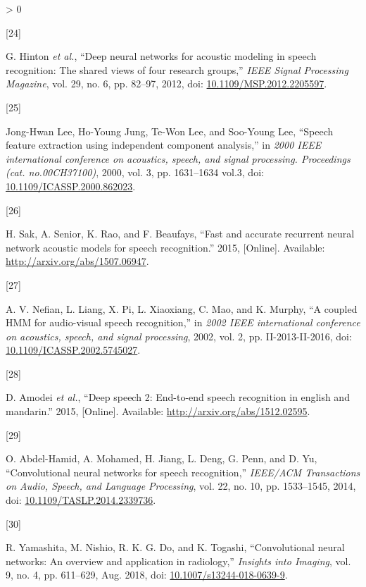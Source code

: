 \documentclass[
  a4paper,
]{article}
\newlength{\cslhangindent}
\newlength{\csllabelwidth}
\newenvironment{CSLReferences}[2] %
 {%
  \setlength{\parindent}{0pt}
  \ifodd #1 \everypar{\setlength{\hangindent}{\cslhangindent}}\ignorespaces\fi
  \ifnum #2 > 0
  \setlength{\parskip}{#2\baselineskip}
  \fi
 }%
 {}
\newcommand{\CSLLeftMargin}[1]{\parbox[t]{\csllabelwidth}{#1}}
\newcommand{\CSLRightInline}[1]{\parbox[t]{\linewidth - \csllabelwidth}{#1}\break}
\begin{document}
\begin{CSLReferences}{0}{0}
\leavevmode\hypertarget{ref-6296526}{}%
\CSLLeftMargin{{[}24{]} }
\CSLRightInline{G. Hinton \emph{et al.}, {``Deep neural networks for
acoustic modeling in speech recognition: The shared views of four
research groups,''} \emph{IEEE Signal Processing Magazine}, vol. 29, no.
6, pp. 82--97, 2012, doi:
\href{https://doi.org/10.1109/MSP.2012.2205597}{10.1109/MSP.2012.2205597}.}

\leavevmode\hypertarget{ref-862023}{}%
\CSLLeftMargin{{[}25{]} }
\CSLRightInline{Jong-Hwan Lee, Ho-Young Jung, Te-Won Lee, and Soo-Young
Lee, {``Speech feature extraction using independent component
analysis,''} in \emph{2000 IEEE international conference on acoustics,
speech, and signal processing. Proceedings (cat. no.00CH37100)}, 2000,
vol. 3, pp. 1631--1634 vol.3, doi:
\href{https://doi.org/10.1109/ICASSP.2000.862023}{10.1109/ICASSP.2000.862023}.}

\leavevmode\hypertarget{ref-sak2015fast}{}%
\CSLLeftMargin{{[}26{]} }
\CSLRightInline{H. Sak, A. Senior, K. Rao, and F. Beaufays, {``Fast and
accurate recurrent neural network acoustic models for speech
recognition.''} 2015, {[}Online{]}. Available:
\url{http://arxiv.org/abs/1507.06947}.}

\leavevmode\hypertarget{ref-5745027}{}%
\CSLLeftMargin{{[}27{]} }
\CSLRightInline{A. V. Nefian, L. Liang, X. Pi, L. Xiaoxiang, C. Mao, and
K. Murphy, {``A coupled HMM for audio-visual speech recognition,''} in
\emph{2002 IEEE international conference on acoustics, speech, and
signal processing}, 2002, vol. 2, pp. II-2013-II-2016, doi:
\href{https://doi.org/10.1109/ICASSP.2002.5745027}{10.1109/ICASSP.2002.5745027}.}

\leavevmode\hypertarget{ref-amodei2015deep}{}%
\CSLLeftMargin{{[}28{]} }
\CSLRightInline{D. Amodei \emph{et al.}, {``Deep speech 2: End-to-end
speech recognition in english and mandarin.''} 2015, {[}Online{]}.
Available: \url{http://arxiv.org/abs/1512.02595}.}

\leavevmode\hypertarget{ref-6857341}{}%
\CSLLeftMargin{{[}29{]} }
\CSLRightInline{O. Abdel-Hamid, A. Mohamed, H. Jiang, L. Deng, G. Penn,
and D. Yu, {``Convolutional neural networks for speech recognition,''}
\emph{IEEE/ACM Transactions on Audio, Speech, and Language Processing},
vol. 22, no. 10, pp. 1533--1545, 2014, doi:
\href{https://doi.org/10.1109/TASLP.2014.2339736}{10.1109/TASLP.2014.2339736}.}

\leavevmode\hypertarget{ref-Yamashita2018}{}%
\CSLLeftMargin{{[}30{]} }
\CSLRightInline{R. Yamashita, M. Nishio, R. K. G. Do, and K. Togashi,
{``Convolutional neural networks: An overview and application in
radiology,''} \emph{Insights into Imaging}, vol. 9, no. 4, pp. 611--629,
Aug. 2018, doi:
\href{https://doi.org/10.1007/s13244-018-0639-9}{10.1007/s13244-018-0639-9}.}


\end{CSLReferences}
\end{document}
